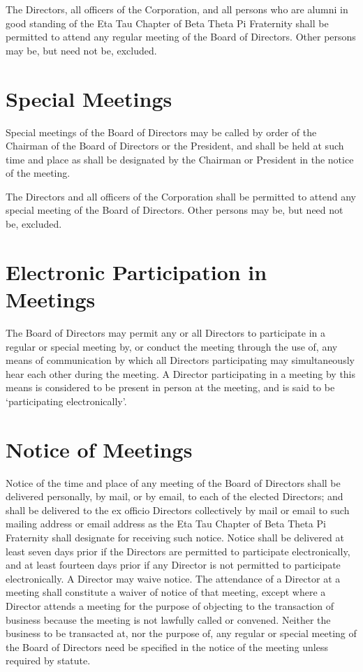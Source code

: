 \documentclass[12pt]{report}
\begin{document}
The Directors, all officers of the Corporation, and all persons who are alumni in good standing of the Eta Tau Chapter of Beta Theta Pi Fraternity shall be permitted to attend any regular meeting of the Board of Directors. Other persons may be, but need not be, excluded.

\section{Special Meetings}

Special meetings of the Board of Directors may be called by order of the Chairman of the Board of Directors or the President, and shall be held at such time and place as shall be designated by the Chairman or President in the notice of the meeting.

The Directors and all officers of the Corporation shall be permitted to attend any special meeting of the Board of Directors. Other persons may be, but need not be, excluded.

\section{Electronic Participation in Meetings}

The Board of Directors may permit any or all Directors to participate in a regular or special meeting by, or conduct the meeting through the use of, any means of communication by which all Directors participating may simultaneously hear each other during the meeting. A Director participating in a meeting by this means is considered to be present in person at the meeting, and is said to be `participating electronically'.

\section{Notice of Meetings}

Notice of the time and place of any meeting of the Board of Directors shall be delivered personally, by mail, or by email, to each of the elected Directors; and shall be delivered to the ex officio Directors collectively by mail or email to such mailing address or email address as the Eta Tau Chapter of Beta Theta Pi Fraternity shall designate for receiving such notice. Notice shall be delivered at least seven days prior if the Directors are permitted to participate electronically, and at least fourteen days prior if any Director is not permitted to participate electronically. A Director may waive notice. The attendance of a Director at a meeting shall constitute a waiver of notice of that meeting, except where a Director attends a meeting for the purpose of objecting to the transaction of business because the meeting is not lawfully called or convened. Neither the business to be transacted at, nor the purpose of, any regular or special meeting of the Board of Directors need be specified in the notice of the meeting unless required by statute.
\end{document}
